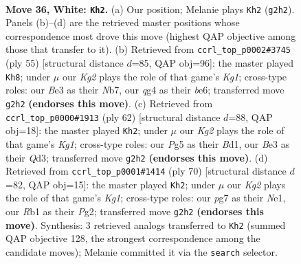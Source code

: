 \documentclass[11pt]{article}
\begin{document}
\clearpage

\begin{figure}[p]\centering
\begin{subfigure}{0.46\textwidth}\centering
\resizebox{\linewidth}{!}{%
\newchessgame
\chessboard[
  setfen={6nr/1kr3p1/8/2p1Q1Pp/2P2Pq1/N3B3/PP4K1/1R6 w - - 9 36},
  showmover=false,
  pgfstyle=straightmove, color=movearrow, markmove={g2-h2}
]}
\caption{}
\end{subfigure}\hfill
\begin{subfigure}{0.46\textwidth}\centering
\resizebox{\linewidth}{!}{%
\newchessgame
\chessboard[
  setfen={1r4k1/pnq3p1/4B2p/2P1p3/8/2Q1pPb1/P5P1/K2R3R b - - 0 28},
  showmover=false,
  pgfstyle=straightmove, color=movearrow, markmove={g8-h8}
]}
\caption{}
\end{subfigure}
\\[4pt]
\begin{subfigure}{0.46\textwidth}\centering
\resizebox{\linewidth}{!}{%
\newchessgame
\chessboard[
  setfen={1k5r/1p6/p1n2r2/3p1pN1/5R1P/P2QP1P1/1q4P1/3B2K1 w - - 0 32},
  showmover=false,
  pgfstyle=straightmove, color=movearrow, markmove={g1-h2}
]}
\caption{}
\end{subfigure}\hfill
\begin{subfigure}{0.46\textwidth}\centering
\resizebox{\linewidth}{!}{%
\newchessgame
\chessboard[
  setfen={k2rr3/p1R5/1p2p3/1P2Q1pp/3P4/6P1/5PP1/1q2N1K1 w - - 4 36},
  showmover=false,
  pgfstyle=straightmove, color=movearrow, markmove={g1-h2}
]}
\caption{}
\end{subfigure}
\caption{\textbf{Move 36, White: \texttt{Kh2}.} (a) Our position; Melanie plays \texttt{Kh2} (\texttt{g2h2}). Panels (b)--(d) are the retrieved master positions whose correspondence most drove this move (highest QAP objective among those that transfer to it). (b) Retrieved from \texttt{ccrl\_top\_p0002\#3745} (ply 55) [structural distance $d$=85, QAP obj=96]: the master played \texttt{Kh8}; under $\mu$ our \emph{Kg2} plays the role of that game's \emph{Kg1}; cross-type roles: our \emph{B}e3 as their \emph{N}b7, our \emph{q}g4 as their \emph{b}e6; transferred move \texttt{g2h2} \textbf{(endorses this move)}. (c) Retrieved from \texttt{ccrl\_top\_p0000\#1913} (ply 62) [structural distance $d$=88, QAP obj=18]: the master played \texttt{Kh2}; under $\mu$ our \emph{Kg2} plays the role of that game's \emph{Kg1}; cross-type roles: our \emph{P}g5 as their \emph{B}d1, our \emph{B}e3 as their \emph{Q}d3; transferred move \texttt{g2h2} \textbf{(endorses this move)}. (d) Retrieved from \texttt{ccrl\_top\_p0001\#1414} (ply 70) [structural distance $d$=82, QAP obj=15]: the master played \texttt{Kh2}; under $\mu$ our \emph{Kg2} plays the role of that game's \emph{Kg1}; cross-type roles: our \emph{p}g7 as their \emph{N}e1, our \emph{R}b1 as their \emph{P}g2; transferred move \texttt{g2h2} \textbf{(endorses this move)}. Synthesis: 3 retrieved analogs transferred to \texttt{Kh2} (summed QAP objective 128, the strongest correspondence among the candidate moves); Melanie committed it via the \texttt{search} selector.}
\label{fig:thought-m70}
\end{figure}
\end{document}
